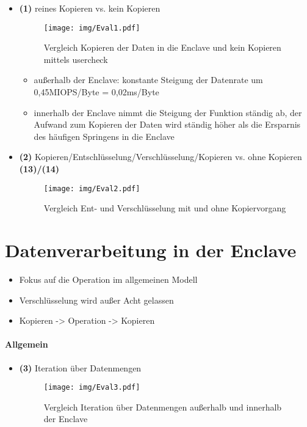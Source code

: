 \begin{itemize}
	\item \textbf{(1)} reines Kopieren vs. kein Kopieren
	\begin{figure}[h]
		\texttt{[image: img/Eval1.pdf]}
		\centering
		\caption{Vergleich Kopieren der Daten in die Enclave und kein Kopieren mittels user\textunderscore check}
		\label{fig:eval1}
	\end{figure}
	
	\begin{itemize}
		\item außerhalb der Enclave: konstante Steigung der Datenrate um 0,45MIOPS/Byte = 0,02ms/Byte
		\item innerhalb der Enclave nimmt die Steigung der Funktion ständig ab, der Aufwand zum Kopieren der Daten wird ständig höher als die Ersparnis des häufigen Springens in die Enclave
	\end{itemize}
	
	\item \textbf{(2)} Kopieren/Entschlüsselung/Verschlüsselung/Kopieren vs. ohne Kopieren \textbf{(13)/(14)} 
	\begin{figure}[h]
		\texttt{[image: img/Eval2.pdf]}
		\centering
		\caption{Vergleich Ent- und Verschlüsselung mit und ohne Kopiervorgang}
		\label{fig:eval2}
	\end{figure}
	
\end{itemize}

\section{Datenverarbeitung in der Enclave}

\begin{itemize}
	\item Fokus auf die Operation im allgemeinen Modell
	\item Verschlüsselung wird außer Acht gelassen
	\item Kopieren -> Operation -> Kopieren
\end{itemize}

\paragraph{Allgemein}

\begin{itemize}
	\item \textbf{(3)} Iteration über Datenmengen 
	\begin{figure}[h]
		\texttt{[image: img/Eval3.pdf]}
		\centering
		\caption{Vergleich Iteration über Datenmengen außerhalb und innerhalb der Enclave}
		\label{fig:eval3}
	\end{figure}
\end{itemize}

